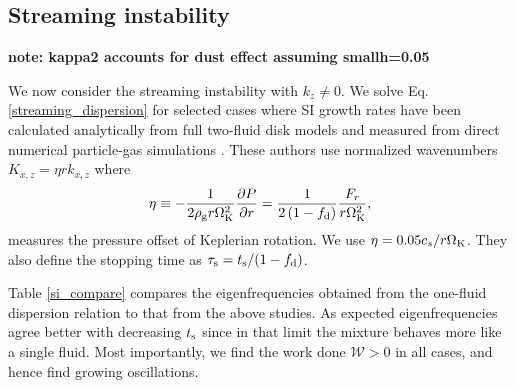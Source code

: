 




\subsection{Streaming instability}

{\bf note: kappa2 accounts for dust effect assuming smallh=0.05}

We now consider the streaming instability with $k_z\neq 0$. 
We solve Eq. \ref{streaming_dispersion} for selected cases where SI  
growth rates have been 
calculated analytically from full two-fluid disk models and measured 
from direct numerical particle-gas simulations 
\citep[namely][]{youdin07b,bai10b}. These authors use normalized
wavenumbers $K_{x,z} = \eta r k_{x,z}$ where
\begin{align} 
  \eta \equiv -\frac{1}{2\rho_\mathrm{g} r\Omega_{\rm K}^2}\frac{\partial P}{\partial r} = 
  \frac{1}{2\left(1-f_\mathrm{d}\right)}\frac{F_r}{r\Omega_{\rm K}^2}, 
\end{align} 
measures the pressure offset of Keplerian rotation. We use
$\eta=0.05c_s/r\Omega_{\rm K}$. They also define the stopping time as
$\tau_\mathrm{s}=t_\mathrm{s}/(1-f_\mathrm{d})$.  

Table \ref{si_compare} compares the eigenfrequencies obtained from the
one-fluid dispersion relation to that from the above studies. As  
expected eigenfrequencies agree better with decreasing $t_\mathrm{s}$ since
in that limit the mixture behaves more like a single fluid. Most 
importantly, we find the work done $\mathcal{W}>0$ in all cases, and
hence find growing oscillations. 

